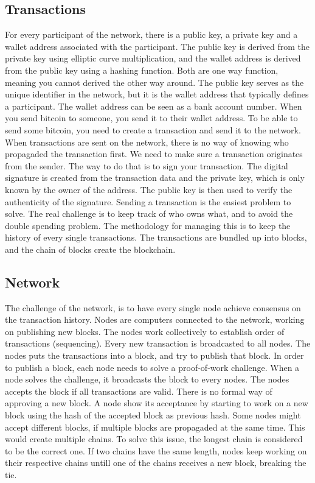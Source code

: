 \subsection{Transactions}
For every participant of the network, there is a public key, a private key and a wallet address associated with the participant.
The public key is derived from the private key using elliptic curve multiplication, and the wallet address is derived from the public key using a hashing function.
Both are one way function, meaning you cannot derived the other way around.
The public key serves as the unique identifier in the network, but it is the wallet address that typically defines a participant.
The wallet address can be seen as a bank account number. When you send bitcoin to someone, you send it to their wallet address.
To be able to send some bitcoin, you need to create a transaction and send it to the network. 
When transactions are sent on the network, there is no way of knowing who propagaded the transaction first.
We need to make sure a transaction originates from the sender. The way to do that is to sign your transaction. The digital signature is created from the transaction data and the private key, which is only known by the owner of the address.
The public key is then used to verify the authenticity of the signature.
Sending a transaction is the easiest problem to solve. The real challenge is to keep track of who owns what, and to avoid the double spending problem.
The methodology for managing this is to keep the history of every single transactions. The transactions are bundled up into blocks, and the chain of blocks create the blockchain.


\subsection{Network}
The challenge of the network, is to have every single node achieve consensus on the transaction history. Nodes are computers connected to the network,
working on publishing new blocks. The nodes work collectively to establish order of transactions (sequencing). Every new transaction is broadcasted to all nodes.
The nodes puts the transactions into a block, and try to publish that block. In order to publish a block, each node needs to solve a proof-of-work challenge.
When a node solves the challenge, it broadcasts the block to every nodes. The nodes accepts the block if all transactions are valid. There is no formal
way of approving a new block. A node show its acceptance by starting to work on a new block using the hash of the accepted block as previous hash.
Some nodes might accept different blocks, if multiple blocks are propagaded at the same time. This would create multiple chains. To solve this issue, the longest chain is considered to be the correct one. 
If two chains have the same length, nodes keep working on their respective chains untill one of the chains receives a new block, breaking the tie.


